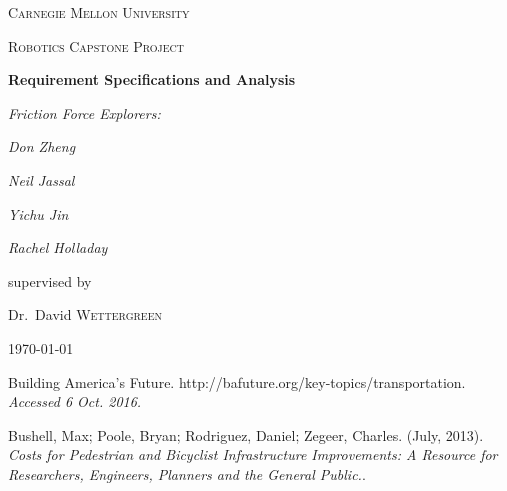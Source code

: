 \documentclass{spec}
\theoremstyle{definition}
\begin{document}
\begin{titlepage}
	\centering
	{\scshape\LARGE Carnegie Mellon University \par}
	\vspace{1cm}
	{\scshape\Large Robotics Capstone Project\par}
	\vspace{1.5cm}
	{\huge\bfseries Requirement Specifications and Analysis\par}
	\vspace{2cm}
	{\Large\itshape Friction Force Explorers:\par}
	\vspace{1cm}
	{\Large\itshape Don Zheng\par}
	{\Large\itshape Neil Jassal\par}
	{\Large\itshape Yichu Jin\par}
	{\Large\itshape Rachel Holladay\par}
	\vfill
	supervised by\par
	Dr.~David \textsc{Wettergreen}

	\vfill

	{\large \today\par}
\end{titlepage}

\tableofcontents
\listoffigures
\clearpage








\pagebreak
\listofchanges
\pagebreak
 
\begin{thebibliography}{9}
Building America's Future.
http://bafuture.org/key-topics/transportation. 
\textit{Accessed 6 Oct. 2016.}
 
Bushell, Max; Poole, Bryan; Rodriguez, Daniel; Zegeer, Charles. 
(July, 2013).
\textit{Costs for Pedestrian and Bicyclist Infrastructure Improvements: A Resource for Researchers, Engineers, Planners and the General Public.}. 
\end{thebibliography}
\end{document}
